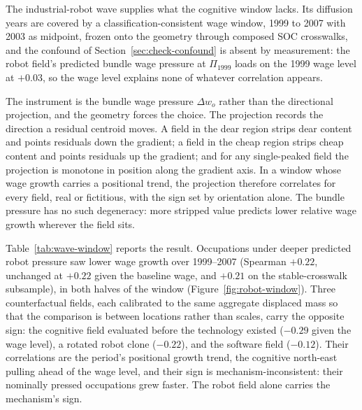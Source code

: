 \documentclass[12pt, a4paper]{article}
\begin{document}
The industrial-robot wave supplies what the cognitive window lacks. Its
diffusion years are covered by a classification-consistent wage window,
1999 to 2007 with 2003 as midpoint, frozen onto the geometry through
composed SOC crosswalks, and the confound of
Section~\ref{sec:check-confound} is absent by measurement: the robot
field's predicted bundle wage pressure at $\Pi_{1999}$ loads on the
1999 wage level at $+0.03$, so the wage level explains none of whatever
correlation appears.

The instrument is the bundle wage pressure $\Delta w_o$ rather than the
directional projection, and the geometry forces the choice. The
projection records the direction a residual centroid moves. A field in
the dear region strips dear content and points residuals down the
gradient; a field in the cheap region strips cheap content and points
residuals up the gradient; and for any single-peaked field the
projection is monotone in position along the gradient axis. In a window
whose wage growth carries a positional trend, the projection therefore
correlates for every field, real or fictitious, with the sign set by
orientation alone. The bundle pressure has no such degeneracy: more
stripped value predicts lower relative wage growth wherever the field
sits.

Table~\ref{tab:wave-window} reports the result. Occupations under
deeper predicted robot pressure saw lower wage growth over 1999--2007
(Spearman $+0.22$, unchanged at $+0.22$ given the baseline wage, and
$+0.21$ on the stable-crosswalk subsample), in both halves of the
window (Figure~\ref{fig:robot-window}). Three counterfactual fields,
each calibrated to the same aggregate displaced mass so that the
comparison is between locations rather than scales, carry the opposite
sign: the cognitive field evaluated before the technology existed
($-0.29$ given the wage level), a rotated robot clone ($-0.22$), and
the software field ($-0.12$). Their correlations are the period's
positional growth trend, the cognitive north-east pulling ahead of the
wage level, and their sign is mechanism-inconsistent: their nominally
pressed occupations grew faster. The robot field alone carries the
mechanism's sign.
\end{document}
